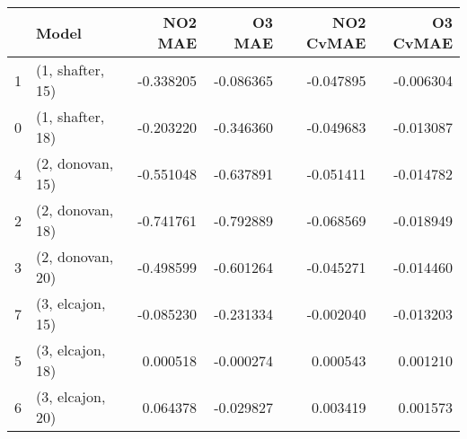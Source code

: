 \begin{tabular}{llrrrr}
\toprule
{} &             Model &   NO2 MAE &    O3 MAE &  NO2 CvMAE &  O3 CvMAE \\
\midrule
1 &  (1, shafter, 15) & -0.338205 & -0.086365 &  -0.047895 & -0.006304 \\
0 &  (1, shafter, 18) & -0.203220 & -0.346360 &  -0.049683 & -0.013087 \\
4 &  (2, donovan, 15) & -0.551048 & -0.637891 &  -0.051411 & -0.014782 \\
2 &  (2, donovan, 18) & -0.741761 & -0.792889 &  -0.068569 & -0.018949 \\
3 &  (2, donovan, 20) & -0.498599 & -0.601264 &  -0.045271 & -0.014460 \\
7 &  (3, elcajon, 15) & -0.085230 & -0.231334 &  -0.002040 & -0.013203 \\
5 &  (3, elcajon, 18) &  0.000518 & -0.000274 &   0.000543 &  0.001210 \\
6 &  (3, elcajon, 20) &  0.064378 & -0.029827 &   0.003419 &  0.001573 \\
\bottomrule
\end{tabular}
